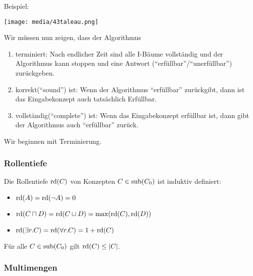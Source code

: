 \begin{tafel}

Beispiel:

\texttt{[image: media/43taleau.png]}

\end{tafel}

Wir müssen nun zeigen, dass der Algorithmus
\begin{enumerate}
    \item terminiert:
        Nach endlicher Zeit sind alle I-Bäume vollständig und der Algorithmus kann stoppen und eine Antwort (\enquote{erfüllbar}/\enquote{unerfüllbar}) zurückgeben.
    \item korrekt(\enquote{sound}) ist:
        Wenn der Algorithmus \enquote{erfüllbar} zurückgibt, dann ist das Eingabekonzept auch tatsächlich Erfüllbar.
    \item vollständig(\enquote{complete}) ist:
        Wenn das Eingabekonzept erfüllbar ist, dann gibt der Algorithmus auch \enquote{erfüllbar} zurück.
\end{enumerate}

Wir beginnen mit Terminierung.

\subsubsection{Rollentiefe}
\label{sec:def-rollentiefe}

Die Rollentiefe $\rd\left(C\right)$ von Konzepten
$C \in \sub\left( C_{0} \right)$ ist induktiv definiert:

\begin{itemize}
\item
  $\rd\left( A \right) = \rd\left( \neg A \right) = 0$
\item
  $\rd\left( C \sqcap D \right) = \rd\left( C \sqcup D \right) = \max\left( \rd\left( C \right),\rd\left( D \right) \right)$
\item
  $\rd\left( \exists r.C \right) = \rd\left( \forall r.C \right) = 1 + \rd\left( C \right)$
\end{itemize}

\begin{lemma}
Für alle $C \in \sub\left( C_{0} \right)$ gilt
$\rd\left( C \right) \leq \left| C \right|$.
\end{lemma}

\subsubsection{Multimengen}\label{multimengen}

